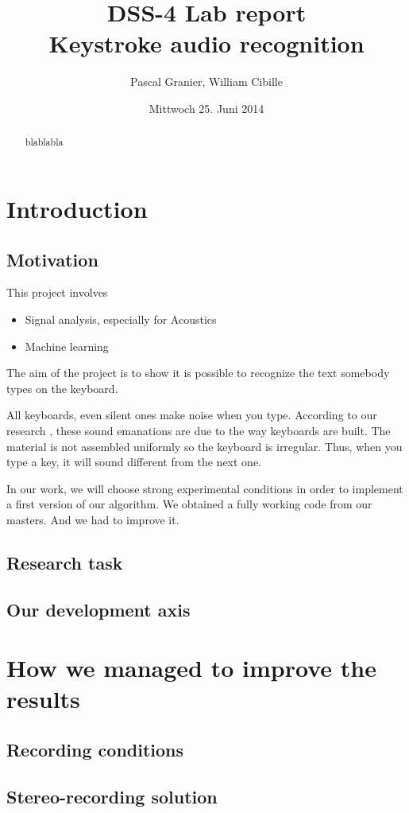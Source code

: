\documentclass[12pt,a4paper]{article}
\author{Pascal Granier, William Cibille}
\title{DSS-4 Lab report\\
Keystroke audio recognition}
\date{Mittwoch 25. Juni 2014}
\begin{document}
\maketitle

\begin{abstract}
blablabla
\end{abstract}

\tableofcontents
\newpage

\section*{Introduction}


\subsection{Motivation}

This project involves
\begin{itemize}
\item Signal analysis, especially for Acoustics
\item Machine learning
\end{itemize}
The aim of the project is to show it is possible to recognize the text somebody types on the keyboard. 

All keyboards, even silent ones make noise when you type. According to our research \cite{Zhuang}, these sound emanations are due to the way keyboards are built. The material is not assembled uniformly so the keyboard is irregular. Thus, when you type a key, it will sound different from the next one. 

In our work, we will choose strong experimental conditions in order to implement a first version of our algorithm. We obtained a fully working code from our masters. And we had to improve it. 

\subsection{Research task}

\subsection{Our development axis}

\section{How we managed to improve the results}

\subsection{Recording conditions}


\subsection{Stereo-recording solution}




\end{document}
